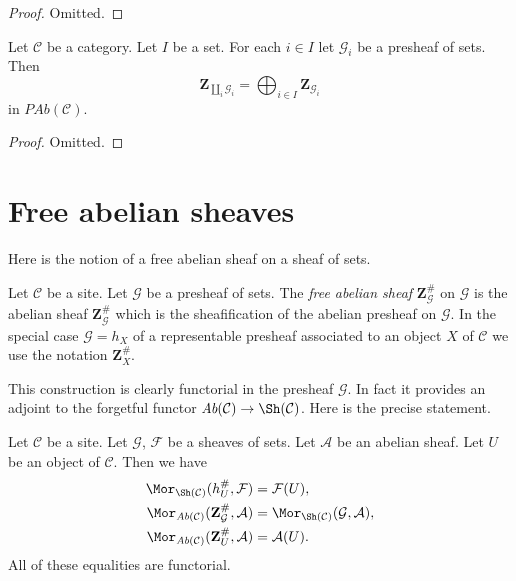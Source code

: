 \begin{proof}
Omitted.
\end{proof}

\begin{lemma}
\label{lemma-coproduct-sum-free-abelian-presheaf}
Let $\mathcal{C}$ be a category.
Let $I$ be a set. For each $i \in I$ let
$\mathcal{G}_i$ be a presheaf of sets.
Then
$$
\mathbf{Z}_{\coprod_i \mathcal{G}_i}
=
\bigoplus\nolimits_{i \in I} \mathbf{Z}_{\mathcal{G}_i}
$$
in $\textit{PAb}(\mathcal{C})$.
\end{lemma}

\begin{proof}
Omitted.
\end{proof}



\section{Free abelian sheaves}
\label{section-free-abelian-sheaf}

\noindent
Here is the notion of a free abelian sheaf on a sheaf of sets.

\begin{definition}
\label{definition-free-abelian-sheaf-on}
Let $\mathcal{C}$ be a site. Let $\mathcal{G}$ be a presheaf of sets.
The {\it free abelian sheaf} $\mathbf{Z}_\mathcal{G}^\#$
on $\mathcal{G}$ is the abelian sheaf $\mathbf{Z}_\mathcal{G}^\#$
which is the sheafification of the abelian presheaf on $\mathcal{G}$.
In the special case $\mathcal{G} = h_X$ of a representable presheaf
associated to an object $X$ of $\mathcal{C}$
we use the notation $\mathbf{Z}_X^\#$.
\end{definition}

\noindent
This construction is clearly functorial in the presheaf $\mathcal{G}$.
In fact it provides an adjoint to the forgetful functor
$\textit{Ab}(\mathcal{C}) \to \Sh(\mathcal{C})$.
Here is the precise statement.

\begin{lemma}
\label{lemma-obvious-adjointness-sheaves}
Let $\mathcal{C}$ be a site.
Let $\mathcal{G}$, $\mathcal{F}$ be a sheaves of sets.
Let $\mathcal{A}$ be an abelian sheaf.
Let $U$ be an object of $\mathcal{C}$. Then
we have
\begin{align*}
\Mor_{\Sh(\mathcal{C})}(h_U^\#, \mathcal{F})
& =
\mathcal{F}(U), \\
\Mor_{\textit{Ab}(\mathcal{C})}(\mathbf{Z}_\mathcal{G}^\#,
\mathcal{A})
& =
\Mor_{\Sh(\mathcal{C})}(\mathcal{G}, \mathcal{A}), \\
\Mor_{\textit{Ab}(\mathcal{C})}(\mathbf{Z}_U^\#, \mathcal{A})
& =
\mathcal{A}(U).
\end{align*}
All of these equalities are functorial.
\end{lemma}


